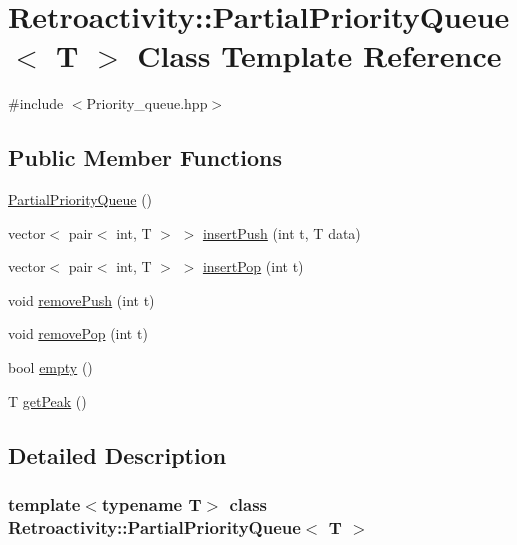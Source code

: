 \hypertarget{classRetroactivity_1_1PartialPriorityQueue}{}\section{Retroactivity\+:\+:Partial\+Priority\+Queue$<$ T $>$ Class Template Reference}
\label{classRetroactivity_1_1PartialPriorityQueue}


{\ttfamily \#include $<$Priority\+\_\+queue.\+hpp$>$}

\subsection*{Public Member Functions}
\begin{DoxyCompactItemize}
\item 
\hyperlink{classRetroactivity_1_1PartialPriorityQueue_a3619069dac07012d7da62552aa95b407}{Partial\+Priority\+Queue} ()
\item 
vector$<$ pair$<$ int, T $>$ $>$ \hyperlink{classRetroactivity_1_1PartialPriorityQueue_aeeb8ac70ed65a8110fa74d14311ef038}{insert\+Push} (int t, T data)
\item 
vector$<$ pair$<$ int, T $>$ $>$ \hyperlink{classRetroactivity_1_1PartialPriorityQueue_a4e66874ab3f2b88c5d45dc50acf09386}{insert\+Pop} (int t)
\item 
void \hyperlink{classRetroactivity_1_1PartialPriorityQueue_a6656a538130dcc2ac9fb25c1c32e1b16}{remove\+Push} (int t)
\item 
void \hyperlink{classRetroactivity_1_1PartialPriorityQueue_ae2aee692f0e15ecf1e580b2607bc873b}{remove\+Pop} (int t)
\item 
bool \hyperlink{classRetroactivity_1_1PartialPriorityQueue_affda050c80b31b4de940183a1b143f59}{empty} ()
\item 
T \hyperlink{classRetroactivity_1_1PartialPriorityQueue_a354d975ff01dea8ea138294efb961fc9}{get\+Peak} ()
\end{DoxyCompactItemize}


\subsection{Detailed Description}
\subsubsection*{template$<$typename T$>$\newline
class Retroactivity\+::\+Partial\+Priority\+Queue$<$ T $>$}

